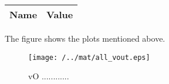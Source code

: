 \begin{table}[ht]
  \centering
  \begin{tabular}{|l|r|}
    \hline    
    {\bf Name} & {\bf Value} \\ \hline
    
  \end{tabular}
  \caption{}
  \label{tab:p2}
\end{table}


The figure shows the plots mentioned above.

\begin{figure}[h] \centering
\texttt{[image: /../mat/all\_vout.eps]}
\caption{vO ............}
\label{sim3}
\end{figure}



















